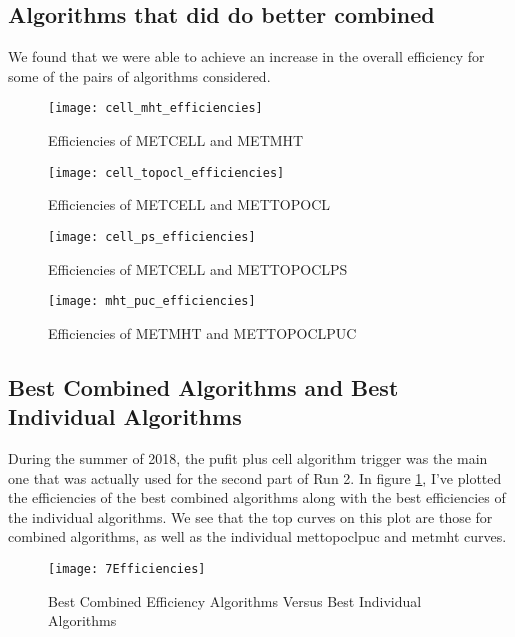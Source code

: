 \subsection{Algorithms that did do better combined}
We found that we were able to achieve an increase in the overall efficiency for some of the pairs of algorithms considered. 
\begin{figure}[h]
        \centering
        \texttt{[image: cell\_mht\_efficiencies]}
        \caption{Efficiencies of METCELL and METMHT}
\end{figure}
\begin{figure}[h]
        \centering
        \texttt{[image: cell\_topocl\_efficiencies]}
        \caption{Efficiencies of METCELL and METTOPOCL}
\end{figure}
\begin{figure}[h]
        \centering
        \texttt{[image: cell\_ps\_efficiencies]}
        \caption{Efficiencies of METCELL and METTOPOCLPS}
\end{figure}
\begin{figure}[h]
        \centering
        \texttt{[image: mht\_puc\_efficiencies]}
        \caption{Efficiencies of METMHT and METTOPOCLPUC}
\end{figure}
\clearpage
\subsection{Best Combined Algorithms and Best Individual Algorithms}
During the summer of 2018, the pufit plus cell algorithm trigger was the main one that was actually used for the second part of Run 2.
In figure \ref{bisection_fig}, I've plotted the efficiencies of the best combined algorithms along with the best efficiencies of the individual algorithms. We see that the top curves on this plot are those for combined algorithms, as well as the individual mettopoclpuc and metmht curves.
\begin{figure}[h]
        \centering
        \texttt{[image: 7Efficiencies]}
        \caption{Best Combined Efficiency Algorithms Versus Best Individual Algorithms}
        \label{bisection_fig}
\end{figure}
\clearpage
